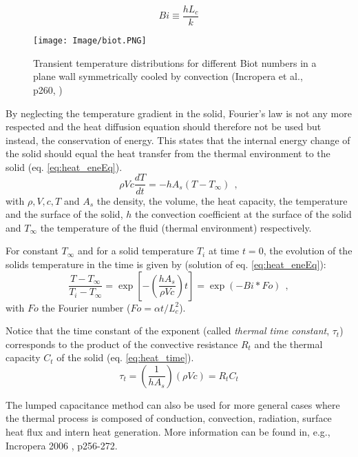 \documentclass[a4paper,oneside,11pt]{report}
\begin{document}
\begin{equation} \label{eq:heat_Biot}
	Bi \equiv \frac{h L_c}{ k }
\end{equation}

\begin{figure}[hbtp] 
	\centering
	\texttt{[image: Image/biot.PNG]}
	\caption{ Transient temperature distributions for different Biot numbers in a plane wall symmetrically cooled by convection (Incropera et al., p260, \cite{Inc06}) }
	\label{fig:heat_biot}
\end{figure}

By neglecting the temperature gradient in the solid, Fourier's law is not any more respected and the heat diffusion equation should therefore not be used but instead, the conservation of energy. This states that the internal energy change of the solid should equal the heat transfer from the thermal environment to the solid (eq. \ref{eq:heat_eneEq}).
\begin{equation} \label{eq:heat_eneEq}
	\rho V c \frac{dT}{dt} = - h A_s (T - T_\infty) \ \ ,
\end{equation}
with $\rho, V, c, T$ and $A_s$ the density, the volume, the heat capacity, the temperature and the surface of the solid, $h$ the convection coefficient at the surface of the solid and $T_\infty$ the temperature of the fluid (thermal environment) respectively.

For constant $T_\infty$ and for a solid temperature $T_i$ at time $t=0$, the evolution of the solids temperature in the time is given by (solution of eq. \ref{eq:heat_eneEq}):
\begin{equation} \label{eq:heat_eneSol}
	\frac{T - T_\infty}{T_i - T_\infty} = \exp\left[ - \left( \frac{h A_s}{\rho V c} \right) t \right] = \exp( - Bi * Fo) \ \ ,
\end{equation}
with $Fo$ the Fourier number ($Fo = \alpha t / L_c^2$).

Notice that the time constant of the exponent (called \textit{thermal time constant}, $\tau_t$) corresponds to the product of the convective resistance $R_t$ and the thermal capacity $C_t$ of the solid (eq. \ref{eq:heat_time}).
\begin{equation} \label{eq:heat_time}
	\tau_t = \left( \frac{1}{h A_s} \right) ( \rho V c ) = R_t C_t
\end{equation}

The lumped capacitance method can also be used for more general cases where the thermal process is composed of conduction, convection, radiation, surface heat flux and intern heat generation. More information can be found in, e.g., Incropera 2006 \cite{Inc06}, p256-272.
\end{document}
